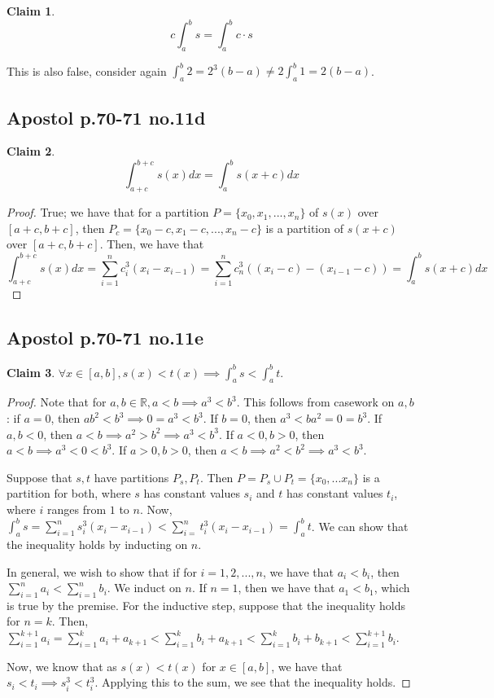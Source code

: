 \documentclass[12pt,letterpaper]{article}
\theoremstyle{definition}
\newtheorem*{claim}{Claim}
\newcommand{\R}{\mathbb{R}}
\begin{document}
\begin{claim}
  $$c\int_a^bs = \int_a^b c \cdot s $$
\end{claim}

This is also false, consider again $\int_a^b2 = 2^3(b-a) \neq 2\int_a^b 1 = 2(b-a)$.

\subsection*{Apostol p.70-71 no.11d}

\begin{claim}
  $$\int_{a+c}^{b+c} s(x)dx = \int_a^b s(x+c)dx $$
\end{claim}

\begin{proof}
  True; we have that for a partition $P = \{x_0, x_1,...,x_n\}$ of $s(x)$ over $[a+c,b+c]$, then $P_c =
  \{x_0 - c, x_1 - c,...,x_n - c\}$ is a partition of $s(x + c)$ over $[a+c,b+c]$.
  Then, we have that
  \[
    \int_{a+c}^{b+c}s(x)dx = \sum_{i=1}^nc_i^3(x_i - x_{i-1}) =
    \sum_{i=1}^nc_n^3((x_i - c) - (x_{i-1} - c)) = \int_a^bs(x + c)dx
  \]
\end{proof}

\subsection*{Apostol p.70-71 no.11e}

\begin{claim}
  $\forall x \in [a,b], s(x) < t(x) \implies \int_a^bs < \int_a^bt$.
\end{claim}

\begin{proof}
  Note that for $a,b \in \R, a < b \implies a^3 < b^3$. This follows from
  casework on $a,b$: if $a = 0$, then $ab^2 < b^3 \implies 0 = a^3 < b^3$. If $b
  = 0$, then $a^3 < ba^2 = 0 = b^3$. If $a, b < 0$, then $a < b \implies a^2 >
  b^2 \implies a^3 < b^3$. If $a < 0, b > 0$, then $a < b \implies a^3 < 0 <
  b^3$. If $a>0, b>0$, then $a<b \implies a^2 < b^2 \implies a^3 < b^3$.
    
  Suppose that $s,t$ have partitions $P_s, P_t$. Then $P = P_s \cup P_t =
  \{x_0,...x_n\}$ is a partition for both, where $s$ has constant values $s_i$
  and $t$ has constant values $t_i$, where $i$ ranges from $1$ to $n$.
  Now, $\int_a^b s = \sum_{i=1}^n s_i^3(x_i - x_{i-1}) < \sum_{i=}^n t_i^3(x_i -
  x_{i-1}) = \int_a^b t$. We can show that the inequality holds by inducting on $n$. 
  
  In general, we wish to show that if for $i = 1,2,...,n$, we have that $a_i <
  b_i$, then $\sum_{i=1}^na_i < \sum_{i=1}^nb_i$. We induct on $n$. If $n = 1$, then we have that $a_1 < b_1$, which is true by the premise. For the inductive step, suppose that the inequality holds for $n = k$. Then,
  $\sum_{i=1}^{k+1}a_i = \sum_{i=1}^k a_i + a_{k+1} < \sum_{i=1}^k b_i + a_{k+1} < \sum_{i=1}^k b_i + b_{k+1} < \sum_{i=1}^{k+1} b_i$.
  
  Now, we know that as $s(x) < t(x)$ for $x \in [a,b]$, we have that $s_i < t_i \implies s_i^3 < t_i^3$. Applying this to the sum, we see that the inequality holds.
  
\end{proof}
\end{document}
